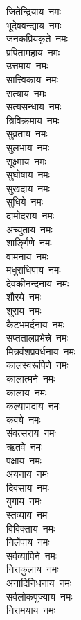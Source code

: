 \begin{multicols}{2}
\begin{flushleft}
जितेन्द्रियाय~नमः\\
भूदेववन्द्याय~नमः\\
जनकप्रियकृते~नमः\\
प्रपितामहाय~नमः\\
उत्तमाय~नमः\\
सात्त्विकाय~नमः\\
सत्याय~नमः\\
सत्यसन्धाय~नमः\\
त्रिविक्रमाय~नमः\\
सुव्रताय~नमः\hfill{}\\
सुलभाय~नमः\\
सूक्ष्माय~नमः\\
सुघोषाय~नमः\\
सुखदाय~नमः\\
सुधिये~नमः\\
दामोदराय~नमः\\
अच्युताय~नमः\\
शार्ङ्गिणे~नमः\\
वामनाय~नमः\\
मधुराधिपाय~नमः\hfill{}\\
देवकीनन्दनाय~नमः\\
शौरये~नमः\\
शूराय~नमः\\
कैटभमर्दनाय~नमः\\
सप्ततालप्रभेत्त्रे~नमः\\
मित्रवंशप्रवर्धनाय~नमः\\
कालस्वरूपिणे~नमः\\
कालात्मने~नमः\\
कालाय~नमः\\
कल्याणदाय~नमः\hfill{}\\
कवये~नमः\\
संवत्सराय~नमः\\
ऋतवे~नमः\\
पक्षाय~नमः\\
अयनाय~नमः\\
दिवसाय~नमः\\
युगाय~नमः\\
स्तव्याय~नमः\\
विविक्ताय~नमः\\
निर्लेपाय~नमः\hfill{}\\
सर्वव्यापिने~नमः\\
निराकुलाय~नमः\\
अनादिनिधनाय~नमः\\
सर्वलोकपूज्याय~नमः\\
निरामयाय~नमः\\

\end{flushleft}
\end{multicols}
